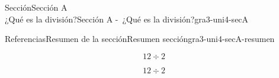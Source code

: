 \begin{sectionptx}{Sección}{{\Large Sección A\\}¿Qué es la división?}{}{Sección A -~¿Qué es la división?}{}{}{gra3-uni4-secA}
\begin{references-subsection}{Referencias}{Resumen de la sección}{}{Resumen sección}{}{}{gra3-uni4-secA-resumen}
\begin{sidebyside}{2}{0.025}{0.025}{0.05}
\begin{sbspanel}{0.45}
%
\begin{equation*}
12 \div 2
\end{equation*}
%
\end{sbspanel}%
\begin{sbspanel}{0.45}%
\par
%
\begin{equation*}
12 \div 2
\end{equation*}
%
\end{sbspanel}%
\end{sidebyside}%
\end{references-subsection}
\end{sectionptx}
%
%
\typeout{************************************************}
\typeout{************************************************}
%
\vspace*{-2ex}
